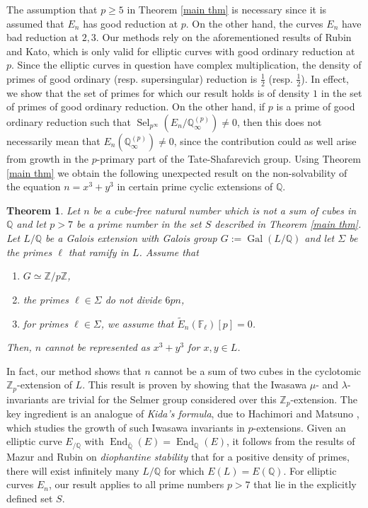 \documentclass[11pt]{amsart}
\newtheorem{theorem}{Theorem}[section]
\newcommand{\Z}{\mathbb{Z}}
\newcommand{\Q}{\mathbb{Q}}
\newcommand{\F}{\mathbb{F}}
\newcommand{\op}[1]{\operatorname{#1}}
\numberwithin{equation}{section}
\begin{document}
The assumption that $p\geq 5$ in Theorem \ref{main thm} is necessary since it is assumed that $E_n$ has good reduction at $p$. On the other hand, the curves $E_n$ have bad reduction at $2,3$. Our methods rely on the aforementioned results of Rubin and Kato, which is only valid for elliptic curves with good ordinary reduction at $p$.  Since the elliptic curves in question have complex multiplication,  the density of primes of good ordinary (resp. supersingular) reduction is $\frac{1}{2}$ (resp. $\frac{1}{2}$).  In effect, we show that the set of primes for which our result holds is of density $1$ in the set of primes of good ordinary reduction.  On the other hand, if $p$ is a prime of good ordinary reduction such that $\op{Sel}_{p^\infty}(E_n/\Q_\infty^{(p)})\neq 0$,  then this does not necessarily mean that $E_n(\Q_\infty^{(p)})\neq 0$,  since the contribution could as well arise from growth in the $p$-primary part of the Tate-Shafarevich group. Using Theorem \ref{main thm} we obtain the following unexpected result on the non-solvability of the equation $n=x^3+y^3$ in certain prime cyclic extensions of $\Q$. 

\begin{theorem}\label{aux thm}
    Let $n$ be a cube-free natural number which is not a sum of cubes in $\Q$ and let $p>7$ be a prime number in the set $S$ described in Theorem \ref{main thm}. Let $L/\Q$ be a Galois extension with Galois group $G:=\op{Gal}(L/\Q)$ and let $\Sigma$ be the primes $\ell$ that ramify in $L$. Assume that 
    \begin{enumerate}
        \item $G\simeq \Z/p\Z$, 
        \item the primes $\ell\in \Sigma$ do not divide $6pn$,
        \item for primes $\ell\in \Sigma$, we assume that $\widetilde{E}_n(\F_\ell)[p]=0$.
    \end{enumerate}
    Then, $n$ \emph{cannot} be represented as $x^3+y^3$ for $x,y\in L$.
\end{theorem}

In fact, our method shows that $n$ cannot be a sum of two cubes in the cyclotomic $\Z_p$-extension of $L$. This result is proven by showing that the Iwasawa $\mu$- and $\lambda$-invariants are trivial for the Selmer group considered over this $\Z_p$-extension. The key ingredient is an analogue of \emph{Kida's formula}, due to Hachimori and Matsuno \cite{HachimoriMatsuno}, which studies the growth of such Iwasawa invariants in $p$-extensions. Given an elliptic curve $E_{/\Q}$ with $\op{End}_{\bar{\Q}}(E)=\op{End}_{\Q}(E)$, it follows from the results of Mazur and Rubin \cite{Mazurrubindiophantine} on \emph{diophantine stability} that for a positive density of primes, there will exist infinitely many $L/\Q$ for which $E(L)=E(\Q)$. For elliptic curves $E_n$, our result applies to all prime numbers $p>7$ that lie in the explicitly defined set $S$.
\end{document}
